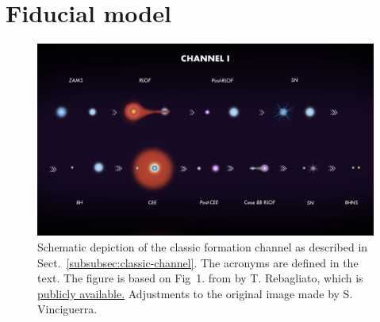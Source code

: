 \documentclass[twocolumn]{aastex63}
\newcommand{\floor}[1]{\textbf{\textcolor{magenta}{[Floor: #1]}}}
\newcommand{\todo}[1]{\textcolor{red}{[To do: #1]}}
\begin{document}
%







\section{Fiducial model}
\label{sec:results-fiducial}
%

%
\begin{figure}
%
\includegraphics[width=1\textwidth]{../OtherImages/ClassicChannel}
   \caption{Schematic depiction of the classic formation channel as described in  Sect.~\ref{subsubsec:classic-channel}.  The acronyms are defined in the text.   The figure is based  on Fig~1. from \citet{2020arXiv200109829V} by T. Rebagliato, which is   \href{https://zenodo.org/record/3634498\#.XnS9ZC2ZNQI}{publicly available.} Adjustments to the original image made by S. Vinciguerra.}
    \label{fig:formation-channels-sketch}
%
\end{figure}
%
%
\end{document}
